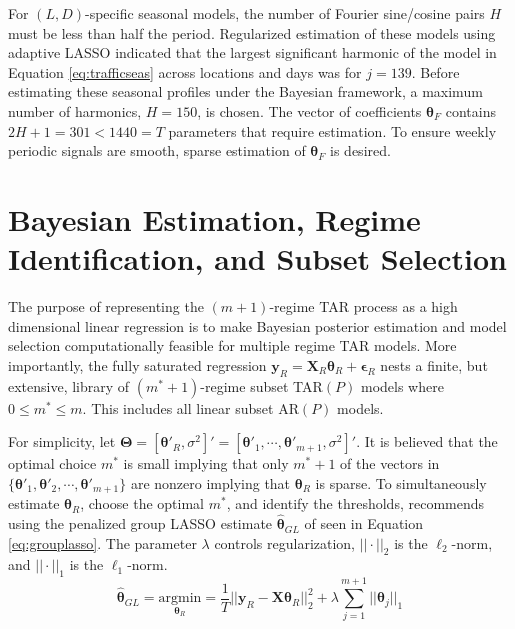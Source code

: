 For $(L,D)$-specific seasonal models, the number of Fourier sine/cosine pairs $H$ must be less than half the period. Regularized estimation of these models using adaptive LASSO \citep{Zou2006} indicated that the largest significant harmonic of the model in Equation \ref{eq:trafficseas} across locations and days was for $j=139$. Before estimating these seasonal profiles under the Bayesian framework, a maximum number of harmonics, $H=150$, is chosen. The vector of coefficients $\bm{\theta}_F$ contains $2H+1=301<1440=T$ parameters that require estimation. To ensure weekly periodic signals are smooth, sparse estimation of $\bm{\theta}_F$ is desired.








\section{Bayesian Estimation, Regime Identification, and Subset Selection}
\label{sec:trafficest}

The purpose of representing the $(m+1)$-regime TAR process as a high dimensional linear regression is to make Bayesian posterior estimation and model selection computationally feasible for multiple regime TAR models. More importantly, the fully saturated regression $\bm{y}_R=\bm{X}_R\bm{\theta}_R+\bm{\epsilon}_R$ nests a finite, but extensive, library of $(m^*+1)$-regime subset TAR$(P)$ models where $0\leq m^*\leq m$. This includes all linear subset AR$(P)$ models.

For simplicity, let $\bm{\Theta}=[\bm{\theta}'_R,\sigma^2]'=[\bm{\theta}'_1,\cdots,\bm{\theta}'_{m+1},\sigma^2]'$. It is believed that the optimal choice $m^*$ is small implying that only $m^*+1$ of the vectors in $\{\bm{\theta}'_1,\bm{\theta}'_2,\cdots,\bm{\theta}'_{m+1}\}$ are nonzero implying that $\bm{\theta}_R$ is sparse. To simultaneously estimate $\bm{\theta}_R$, choose the optimal $m^*$, and identify the thresholds, \cite{Chan2015} recommends using the penalized group LASSO estimate $\hat{\bm{\theta}}_{GL}$ of \cite{Yuan2006} seen in Equation \ref{eq:grouplasso}. The parameter $\lambda$ controls regularization, $||\cdot||_2$ is the $\ell_2$-norm, and $||\cdot||_1$ is the $\ell_1$-norm.
\begin{equation}
\label{eq:grouplasso}
\hat{\bm{\theta}}_{GL}=\underset{\bm{\theta}_R}{\textrm{argmin}}=\frac{1}{T}||\bm{y}_R-\bm{X}\bm{\theta}_{R}||_2^2+\lambda\sum\limits_{j=1}^{m+1}||\bm{\theta}_j||_1
\end{equation}

